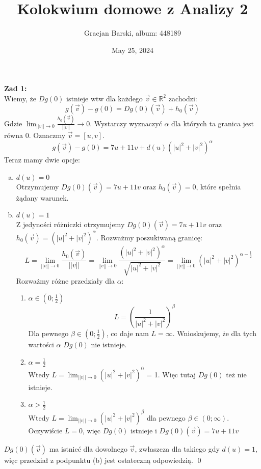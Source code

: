 \documentclass[11pt]{article}
\title{Kolokwium domowe z Analizy 2}
\author{Gracjan Barski, album: 448189}
\date{May 25, 2024}
\newcommand{\R}{\mathbb{R}}
\newcommand{\Dis}{\displaystyle}
\newcommand{\half}{\frac{1}{2}}
\begin{document}
\maketitle
\onehalfspacing
\textbf{Zad 1:} \\[5pt]
Wiemy, że $Dg(0)$ istnieje wtw dla każdego $\Vec{v} \in \R^2$ zachodzi:
$$g(\Vec{v}) - g(0) = Dg(0)(\Vec{v}) + h_0(\Vec{v})$$
Gdzie $\Dis \lim_{||v|| \to 0} \frac{h_0(\Vec{v})}{||v||} \to 0$. Wystarczy wyznaczyć $\alpha$ dla których ta granica jest równa 0. Oznaczmy $\Vec{v} = [u, v]$.
$$g(\Vec{v}) - g(0) = 7u + 11v + d(u)(|u|^2 + |v|^2)^\alpha$$
Teraz mamy dwie opcje:
\begin{enumerate}[(a)]
    \item $d(u) = 0$ \\[5pt]
    Otrzymujemy $Dg(0)(\Vec{v}) = 7u + 11v$ oraz $h_0(\Vec{v}) = 0$, które spełnia żądany warunek.

    \item $d(u) = 1$ \\[5pt]
    Z jedyności różniczki otrzymujemy $Dg(0)(\Vec{v}) = 7u + 11v$ oraz $h_0(\Vec{v}) = (|u|^2+|v|^2)^\alpha$. Rozważmy poszukiwaną granicę:
    $$L = \lim_{||v|| \to 0} \frac{h_0(\Vec{v})}{||v||} = \lim_{||v|| \to 0} \frac{(|u|^2+|v|^2)^\alpha}{\sqrt{|u|^2+|v|^2}} = \lim_{||v|| \to 0} (|u|^2+|v|^2)^{\alpha - \half}$$
    Rozważmy różne przedziały dla $\alpha$:
    \begin{enumerate}[$1^\circ$]
        \item $\alpha \in (0; \half)$
        $$L = \left(\frac{1}{|u|^2+|v|^2}\right)^\beta$$
        Dla pewnego $\beta \in (0; \half)$, co daje nam $L = \infty$. Wnioskujemy, że dla tych wartości $\alpha$ $Dg(0)$ nie istnieje.

        \item $\alpha = \half$ \\[5pt]
        Wtedy $L = \lim_{||v|| \to 0} (|u|^2+|v|^2)^0$ = 1. Więc tutaj $Dg(0)$ też nie istnieje. 
    
        \item $\alpha > \half$ \\[5pt]
        Wtedy $L = \lim_{||v|| \to 0} (|u|^2+|v|^2)^\beta$ dla pewnego $\beta \in (0; \infty)$. Oczywiście $L = 0$, więc $Dg(0)$ istnieje i $Dg(0)(\Vec{v}) = 7u + 11v$ 
    \end{enumerate}
\end{enumerate}
$Dg(0)(\Vec{v})$ ma istnieć dla dowolnego $\Vec{v}$, zwłaszcza dla takiego gdy $d(u) = 1$, więc przedział z podpunktu (b) jest ostateczną odpowiedzią. \qed
\end{document}
